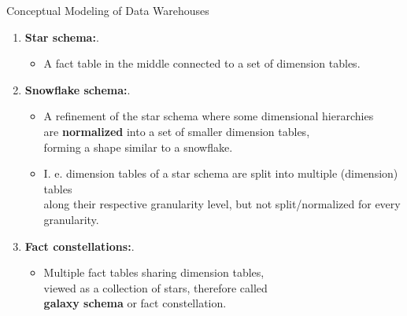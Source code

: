 \begin{frame}{Conceptual Modeling of Data Warehouses}
	\begin{enumerate}
		\item \textbf{Star schema:}.
		      \begin{itemize}
			      \item A fact table in the middle connected to a set of dimension tables.
		      \end{itemize}
		\item \textbf{Snowflake schema:}.
		      \begin{itemize}
			      \item A refinement of the star schema where some dimensional hierarchies \\
			            are \textbf{normalized} into a set of smaller dimension tables,\\
			            forming a shape similar to a snowflake.
			      \item I. e. dimension tables of a star schema are split into multiple (dimension) tables\\ along their respective granularity level, but not split/normalized for every granularity.
		      \end{itemize}
		\item \textbf{Fact constellations:}.
		      \begin{itemize}
			      \item Multiple fact tables sharing dimension tables, \\
			            viewed as a collection of stars, therefore called \\
			            \textbf{galaxy schema} or fact constellation.
		      \end{itemize}
	\end{enumerate}
\end{frame}

